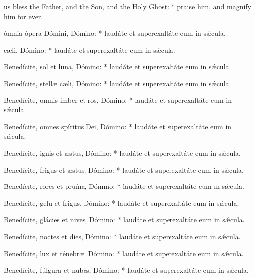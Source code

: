 {     us bless the Father, and the Son, and the Holy Ghost: * praise him, and magnify him for ever.
    }{
 ómnia ópera Dómini, Dómino: * laudáte et superexaltáte eum in sǽcula.\par
{}
 c{\ae}li, Dómino:  * laudáte et superexaltáte eum in sǽcula.\par
{}
Benedícite, sol et luna, Dómino: * laudáte et superexaltáte eum in sǽcula.\par
Benedícite, stell{\ae} c{\ae}li, Dómino: * laudáte et superexaltáte eum in sǽcula.\par
Benedícite, omnis imber et ros, Dómino: * laudáte et superexaltáte eum in sǽcula.\par
Benedícite, omnes spíritus Dei, Dómino: * laudáte et superexaltáte eum in sǽcula.\par
Benedícite, ignis et {\ae}stus, Dómino: * laudáte et superexaltáte eum in sǽcula.\par
Benedícite, frigus et {\ae}stus, Dómino: * laudáte et superexaltáte eum in sǽcula.\par
Benedícite, rores et pruína, Dómino: * laudáte et superexaltáte eum in sǽcula.\par
Benedícite, gelu et frigus, Dómino: * laudáte et superexaltáte eum in sǽcula.\par
Benedícite, glácies et nives, Dómino: * laudáte et superexaltáte eum in sǽcula.\par
Benedícite, noctes et dies, Dómino: * laudáte et superexaltáte eum in sǽcula.\par
Benedícite, lux et ténebr{\ae}, Dómino: * laudáte et superexaltáte eum in sǽcula.\par
Benedícite, fúlgura et nubes, Dómino: * laudáte et superexaltáte eum in sǽcula.\par

}
